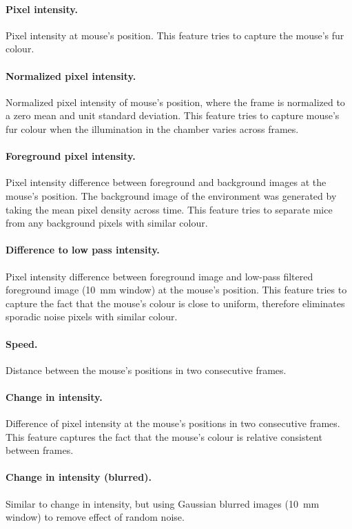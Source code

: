 \paragraph{Pixel intensity.} Pixel intensity at mouse's position. This feature tries to capture the mouse's fur colour.

\paragraph{Normalized pixel intensity.} Normalized pixel intensity of mouse's position, where the frame is normalized to a zero mean and unit standard deviation. This feature tries to capture mouse's fur colour when the illumination in the chamber varies across frames.

\paragraph{Foreground pixel intensity.} Pixel intensity difference between foreground and background images at the mouse's position. The background image of the environment was generated by taking the mean pixel density across time. This feature tries to separate mice from any background pixels with similar colour.

\paragraph{Difference to low pass intensity.} Pixel intensity difference between foreground image and low-pass filtered foreground image (\SI{10}{\mm} window) at the mouse's position. This feature tries to capture the fact that the mouse's colour is close to uniform, therefore eliminates sporadic noise pixels with similar colour.

\paragraph{Speed.} Distance between the mouse's positions in two consecutive frames. 

\paragraph{Change in intensity.} Difference of pixel intensity at the mouse's positions in two consecutive frames. This feature captures the fact that the mouse's colour is relative consistent between frames.

\paragraph{Change in intensity (blurred).} Similar to change in intensity, but using Gaussian blurred images (\SI{10}{\mm} window) to remove effect of random noise.

